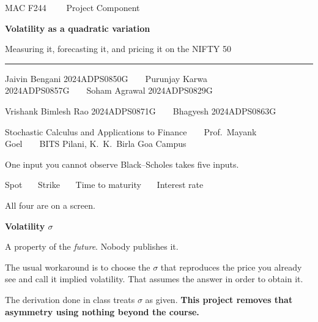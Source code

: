 \documentclass[aspectratio=169,11pt]{beamer}
\newcommand{\lead}[1]{{\sffamily\bfseries\color{accent}#1}}
\begin{document}
{
\begin{frame}
\vspace{1.4em}
{\sffamily\scriptsize\color{accent}MAC F244 \ \ \textbullet\ \ Project Component}\par
\vspace{1.1em}
{\sffamily\bfseries\Huge\color{ink}Volatility as a quadratic variation}\par
\vspace{0.45em}
{\Large\color{muted}Measuring it, forecasting it, and pricing it on the NIFTY 50}\par
\vspace{0.9em}
{\color{accent}\rule{3.2em}{1.6pt}}\par
\vspace{1.0em}
{\sffamily\scriptsize\color{ink}
Jaivin Bengani \textcolor{muted}{2024ADPS0850G}\ \ \textbullet\ \
Purunjay Karwa \textcolor{muted}{2024ADPS0857G}\ \ \textbullet\ \
Soham Agrawal \textcolor{muted}{2024ADPS0829G}\par
\vspace{0.35em}
Vrishank Bimlesh Rao \textcolor{muted}{2024ADPS0871G}\ \ \textbullet\ \
Bhagyesh \textcolor{muted}{2024ADPS0863G}}\par
\vspace{1.0em}
{\sffamily\scriptsize\color{muted}Stochastic Calculus and Applications to Finance\ \ \textbullet\ \
Prof.\ Mayank Goel\ \ \textbullet\ \ BITS Pilani, K.\ K.\ Birla Goa Campus}
\end{frame}}

\begin{frame}{One input you cannot observe}
Black--Scholes takes five inputs.
\vspace{0.5em}

\hspace{1.2em}\begin{minipage}{0.86\textwidth}
{\sffamily\color{muted}Spot \ \textbullet\ \ Strike \ \textbullet\ \ Time to maturity \ \textbullet\ \
Interest rate}\par
\vspace{0.25em}
{\color{muted}All four are on a screen.}\par
\vspace{0.7em}
{\sffamily\bfseries\color{accent}Volatility $\sigma$}\par
\vspace{0.1em}
A property of the \emph{future}. Nobody publishes it.
\end{minipage}
\vspace{0.9em}

\begin{callout}
The usual workaround is to choose the $\sigma$ that reproduces the price you already see and
call it implied volatility. That assumes the answer in order to obtain it.
\end{callout}
\vspace{0.4em}
The derivation done in class treats $\sigma$ as given.
\lead{This project removes that asymmetry using nothing beyond the course.}
\end{frame}
\end{document}
